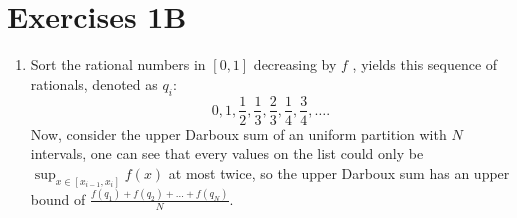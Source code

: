 
\section{Exercises 1B} %
\label{sec:Exercises 1B}

\begin{enumerate}[label=\textbf{1B.\arabic*}]
  \item \label{1B1}
    Sort the rational numbers in \( [0, 1] \) decreasing by \( f \) , yields
    this sequence of rationals, denoted as \( q_{i} \):
    \[
      0, 1, \frac{1}{2}, \frac{1}{3}, \frac{2}{3}, \frac{1}{4}, \frac{3}{4}, \ldots 
    .\] 
    Now, consider the upper Darboux sum of an uniform partition with \( N \)
    intervals, one can see that every values on the list could only be \(
    \sup_{x \in [x_{i-1}, x_{i}]} f(x) \) at most twice, so the upper Darboux
    sum has an upper bound of \( \frac{f(q_{1}) + f(q_{2}) + \ldots + f(q_{N})}{N} \).


\end{enumerate}

